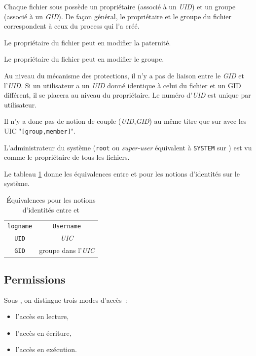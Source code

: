 Chaque fichier sous {\Unix} poss{\`e}de un propri{\'e}taire (associ{\'e} {\`a} un
{\sl UID}) et un groupe (associ{\'e} {\`a} un {\sl GID}). De fa\c{c}on g{\'e}n{\'e}ral, le
propri{\'e}taire et le groupe du fichier correspondent {\`a} ceux du process qui
l'a cr{\'e}{\'e}.

Le propri{\'e}taire du fichier peut en modifier la paternit{\'e}.

Le propri{\'e}taire du fichier peut en modifier le groupe.

Au niveau du m{\'e}canisme des protections, il n'y a pas de liaison entre le
{\sl GID} et l'{\sl UID}. Si un utilisateur a un {\sl UID} donn{\'e}
identique {\`a} celui du fichier et un GID diff{\'e}rent, il se placera au
niveau du propri{\'e}taire. Le num{\'e}ro d'{\sl UID} est unique par
utilisateur.

Il n'y a donc pas de notion de couple ({\sl UID},{\sl GID}) au m{\^e}me
titre que sur {\OpenVMS} avec les UIC "{\tt [group,member]}".

L'administrateur du syst{\`e}me ({\tt root} ou {\sl super-user} {\'e}quivalent {\`a}
{\tt SYSTEM} sur {\OpenVMS}) est vu comme le propri{\'e}taire de tous les
fichiers.

Le tableau \ref{tab-cmds-equiv-root} donne les {\'e}quivalences entre {\Unix}
et {\OpenVMS} pour les notions d'identit{\'e}s sur le syst{\`e}me.

\begin{table}[hbtp]
\centering
\begin{tabular}{|c|c|}
	\hline
		{\Unix}			&	{\OpenVMS}				\\
	\hline \hline
		{\tt logname}	&	{\tt Username}			\\
	\hline
		{\tt UID}		&	{\sl UIC}				\\
	\hline
		{\tt GID}		&	groupe dans l'{\sl UIC}	\\
	\hline
\end{tabular}
\caption{\label{tab-cmds-equiv-root}\'{E}quivalences pour les notions d'identit{\'e}s
entre {\Unix} et {\OpenVMS}}
\end{table}

\subsection{Permissions}

Sous {\Unix}, on distingue trois modes
d'acc{\`e}s~:
\begin{itemize}
	\item l'acc{\`e}s en lecture,
	\item l'acc{\`e}s en {\'e}criture,
	\item l'acc{\`e}s en ex{\'e}cution.
\end{itemize}

